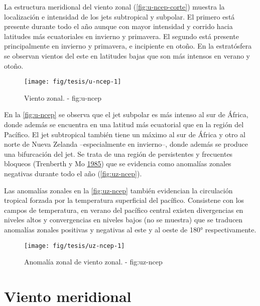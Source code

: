 \documentclass[spanish,a4paper]{book}
\begin{document}
La estructura meridional del viento zonal (\autoref{fig:u-ncep-corte})
muestra la localización e intensidad de los jets subtropical y subpolar.
El primero está presente durante todo el año aunque con mayor intensidad
y corrido hacia latitudes más ecuatoriales en invierno y primavera. El
segundo está presente principalmente en invierno y primavera, e
incipiente en otoño. En la estratósfera se observan vientos del este en
latitudes bajas que son más intensos en verano y otoño.

\begin{figure}

{\centering \texttt{[image: fig/tesis/u-ncep-1]} 

}

\caption{Viento zonal. - fig:u-ncep}\label{fig:u-ncep}
\end{figure}

En la \autoref{fig:u-ncep} se observa que el jet subpolar es más intenso
al sur de África, donde además se encuentra en una latitud más
ecuatorial que en la región del Pacífico. El jet subtropical también
tiene un máximo al sur de África y otro al norte de Nueva Zelanda
--especialmente en invierno--, donde además se produce una bifurcación
del jet. Se trata de una región de persistentes y frecuentes bloqueos
(Trenberth y Mo \protect\hyperlink{ref-Trenberth1985}{1985}) que se
evidencia como anomalías zonales negativas durante todo el año
(\autoref{fig:uz-ncep}).

Las anomalías zonales en la \autoref{fig:uz-ncep} también evidencian la
circulación tropical forzada por la temperatura superficial del
pacífico. Consistene con los campos de temperatura, en verano del
pacífico central existen divergencias en niveles altos y convergencias
en niveles bajos (no se muestra) que se traducen anomalías zonales
positivas y negativas al este y al oeste de 180° respectivamente.

\begin{figure}

{\centering \texttt{[image: fig/tesis/uz-ncep-1]} 

}

\caption{Anomalía zonal de viento zonal. - fig:uz-ncep}\label{fig:uz-ncep}
\end{figure}

\section{Viento meridional}\label{viento-meridional}
\end{document}
